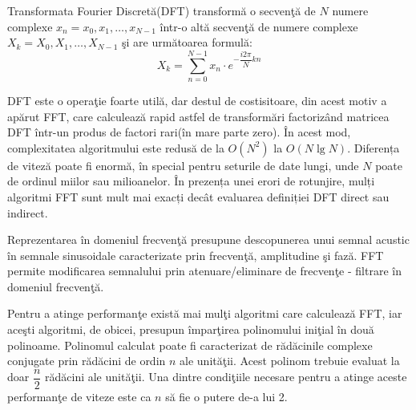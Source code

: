 	Transformata Fourier Discret\u{a}(DFT) transform\u{a} o secven\c{t}\u{a} de $N$ numere complexe ${x_n} = x_0, x_1, \dots, x_{N-1}$ \^{i}ntr-o alt\u{a} secven\c{t}\u{a} de numere complexe ${X_k} = X_0, X_1, \dots, X_{N-1}$ \c{s}i are urm\u{a}toarea formul\u{a}\cite{fft}:
	\begin{equation}
		X_k = \sum_{n=0}^{N-1}x_n \cdot e^{-\dfrac{i2\pi}{N}kn}
	\end{equation}
	\bigskip
	
	DFT este o opera\c{t}ie foarte util\u{a}, dar destul de costisitoare, din acest motiv a ap\u{a}rut FFT, care calculeaz\u{a} rapid astfel de transform\u{a}ri factoriz\^{a}nd matricea DFT \^{i}ntr-un produs de factori rari(\^{i}n mare parte zero). \^{I}n acest mod, complexitatea algoritmului este redus\u{a} de la $O(N^2)$ la $O(N\lg N)$. Diferența de viteză poate fi enormă, în special pentru seturile de date lungi, unde $N$ poate de ordinul miilor sau milioanelor. În prezența unei erori de rotunjire, mulți algoritmi FFT sunt mult mai exacți decât evaluarea definiției DFT direct sau indirect.
	\bigskip
	
	Reprezentarea \^{i}n domeniul frecven\c{t}\u{a} presupune descopunerea unui semnal acustic \^{i}n semnale sinusoidale caracterizate prin frecven\c{t}\u{a}, amplitudine \c{s}i faz\u{a}. FFT permite modificarea semnalului prin atenuare/eliminare de frecven\c{t}e - filtrare \^{i}n domeniul frecven\c{t}\u{a}.
	\bigskip
	
	Pentru a atinge performan\c{t}e exist\u{a} mai mul\c{t}i algoritmi care calculeaz\u{a} FFT, iar ace\c{s}ti algoritmi, de obicei, presupun \^{i}mpar\c{t}irea polinomului ini\c{t}ial \^{i}n dou\u{a} polinoame. Polinomul calculat poate fi caracterizat de r\u{a}d\u{a}cinile complexe conjugate prin r\u{a}d\u{a}cini de ordin $n$ ale unit\u{a}\c{t}ii. Acest polinom trebuie evaluat la doar $\dfrac{n}{2}$ r\u{a}d\u{a}cini ale unit\u{a}\c{t}ii. Una dintre condi\c{t}iile necesare pentru a atinge aceste performan\c{t}e de viteze este ca $n$ s\u{a} fie o putere de-a lui 2.
	\bigskip
	
